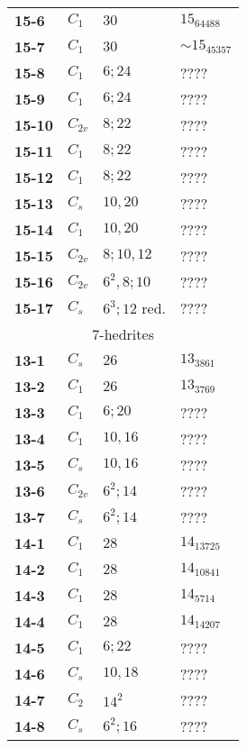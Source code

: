 \documentclass[12pt]{article}
\begin{document}
\begin{table}
\begin{center}
{\begin{minipage}[t]{7cm}
\begin{tabular}{||l|l|l|l||}
{\bf 15-6}      &$C_1$  &$30$   &$15_{64488}$\\
{\bf 15-7}      &$C_1$  &$30$   &$\sim 15_{45357}$\\
{\bf 15-8}      &$C_1$  &$6; 24$        &????\\
{\bf 15-9}      &$C_1$  &$6; 24$        &????\\
{\bf 15-10}     &$C_{2v}$       &$8; 22$     &????\\
{\bf 15-11}     &$C_1$  &$8; 22$        &????\\
{\bf 15-12}     &$C_1$  &$8; 22$        &????\\
{\bf 15-13}     &$C_s$  &$10, 20$       &????\\
{\bf 15-14}     &$C_1$  &$10,20$        &????\\
{\bf 15-15}     &$C_{2v}$       &$8;10,12$      &????\\
{\bf 15-16}     &$C_{2v}$       &$6^2,8;10$     &????\\
{\bf 15-17}     &$C_s$  &$6^3; 12$ red. &????\\\hline\hline
\multicolumn{4}{||c||}{$7$-hedrites}\\\hline
{\bf 13-1}      &$C_s$  &$26$           &$13_{3861}$\\
{\bf 13-2}      &$C_1$  &$26$           &$13_{3769}$\\
{\bf 13-3}      &$C_1$  &$6; 20$                &????\\
{\bf 13-4}      &$C_1$  &$10, 16$               &????\\
{\bf 13-5}      &$C_s$  &$10, 16$               &????\\
{\bf 13-6}      &$C_{2v}$       &$6^2; 14$      &????\\
{\bf 13-7}      &$C_{s}$        &$6^2; 14$      &????\\\hline
{\bf 14-1}      &$C_1$  &$28$           &$14_{13725}$\\
{\bf 14-2}      &$C_1$  &$28$           &$14_{10841}$\\
{\bf 14-3}      &$C_1$  &$28$           &$14_{5714}$\\
{\bf 14-4}      &$C_1$  &$28$           &$14_{14207}$\\
{\bf 14-5}      &$C_1$  &$6; 22$                &????\\
{\bf 14-6}      &$C_s$  &$10, 18$               &????\\
{\bf 14-7}      &$C_2$  &$14^2$         &????\\
{\bf 14-8}      &$C_s$  &$6^2; 16$      &????\\

\end{tabular}
\end{minipage}}
\end{center}
\end{table}
\end{document}
